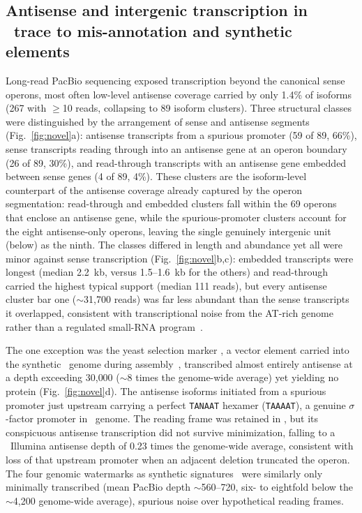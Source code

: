 \subsection{Antisense and intergenic transcription in \syn~trace to mis-annotation and synthetic elements}

Long-read PacBio sequencing exposed transcription beyond the canonical sense operons, most often low-level antisense coverage carried by only 1.4\% of isoforms (267 with $\geq$10 reads, collapsing to 89 isoform clusters).
Three structural classes were distinguished by the arrangement of sense and antisense segments (Fig.~\ref{fig:novel}a): antisense transcripts from a spurious promoter (59 of 89, 66\%), sense transcripts reading through into an antisense gene at an operon boundary (26 of 89, 30\%), and read-through transcripts with an antisense gene embedded between sense genes (4 of 89, 4\%).
These clusters are the isoform-level counterpart of the antisense coverage already captured by the operon segmentation: read-through and embedded clusters fall within the 69 operons that enclose an antisense gene, while the spurious-promoter clusters account for the eight antisense-only operons, leaving the single genuinely intergenic unit (below) as the ninth.
The classes differed in length and abundance yet all were minor against sense transcription (Fig.~\ref{fig:novel}b,c): embedded transcripts were longest (median 2.2~kb, versus 1.5--1.6~kb for the others) and read-through carried the highest typical support (median 111 reads), but every antisense cluster bar one ($\sim$31{,}700 reads) was far less abundant than the sense transcripts it overlapped, consistent with transcriptional noise from the AT-rich genome rather than a regulated small-RNA program~\cite{llorens-rico_bacterial_2016}.

The one exception was the yeast selection marker , a vector element carried into the synthetic \syn~genome during assembly~\cite{gibson_creation_2010}, transcribed almost entirely antisense at a depth exceeding 30{,}000 ($\sim$8 times the genome-wide average) yet yielding no protein (Fig.~\ref{fig:novel}d).
The antisense isoforms initiated from a spurious promoter just upstream carrying a perfect \texttt{TANAAT} hexamer (\texttt{TAAAAT}), a genuine $\sigma$-factor promoter in \syn~genome.
The  reading frame was retained in \syna, but its conspicuous antisense transcription did not survive minimization, falling to a \syna~Illumina antisense depth of 0.23 times the genome-wide average, consistent with loss of that upstream promoter when an adjacent deletion truncated the operon.
The four genomic watermarks as synthetic signatures~\cite{gibson_creation_2010} were similarly only minimally transcribed (mean PacBio depth $\sim$560--720, six- to eightfold below the $\sim$4{,}200 genome-wide average), spurious noise over hypothetical reading frames.


